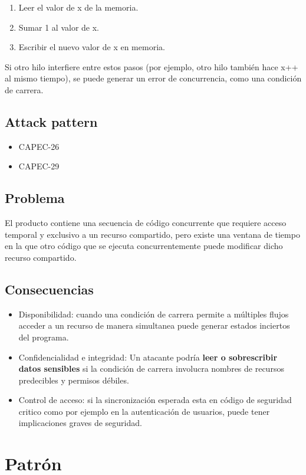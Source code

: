     \begin{enumerate}
        \item Leer el valor de x de la memoria.
        \item Sumar 1 al valor de x.
        \item Escribir el nuevo valor de x en memoria.
    \end{enumerate}
    
    Si otro hilo interfiere entre estos pasos (por ejemplo, otro hilo también hace x++ al mismo tiempo), se puede generar un error de concurrencia, como una condición de carrera.
\subsection{Attack pattern}
\begin{itemize}
    \item CAPEC-26
    \item CAPEC-29
\end{itemize}
\subsection{Problema}
El producto contiene una secuencia de código concurrente que requiere acceso temporal y exclusivo a un recurso compartido, pero existe una ventana de tiempo en la que otro código que se ejecuta concurrentemente puede modificar dicho recurso compartido.
\subsection{Consecuencias}
\begin{itemize}
    \item Disponibilidad: cuando una condición de carrera permite a múltiples flujos acceder a un recurso de manera simultanea puede generar estados inciertos del programa.
    \item Confidencialidad e integridad: Un atacante podría \textbf{leer o sobrescribir datos sensibles} si la condición de carrera involucra nombres de recursos predecibles y permisos débiles.
    \item Control de acceso: si la sincronización esperada esta en código de seguridad critico como por ejemplo en la autenticación de usuarios, puede tener implicaciones graves de seguridad.
\end{itemize}

\section{Patrón}

